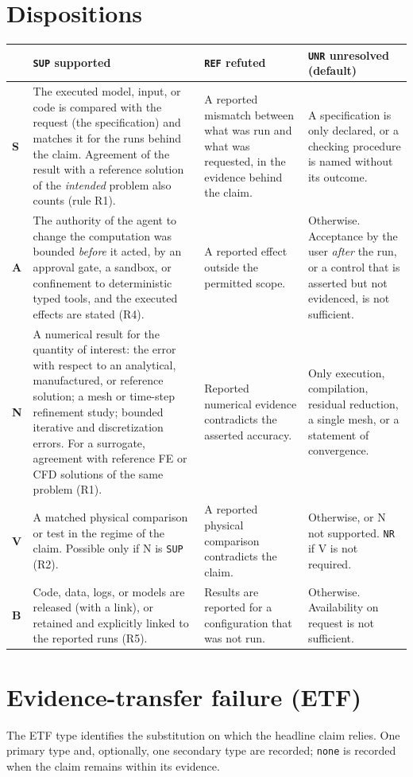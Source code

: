 \documentclass[10pt,a4paper]{article}
\begin{document}
\section{Dispositions}
\begin{tabularx}{\textwidth}{>{\bfseries}p{} L L L}
\toprule
 & \texttt{SUP} supported & \texttt{REF} refuted & \texttt{UNR} unresolved (default) \\
\midrule
S & The executed model, input, or code is compared with the request (the specification) and matches it for the runs behind the claim. Agreement of the result with a reference solution of the \emph{intended} problem also counts (rule R1). & A reported mismatch between what was run and what was requested, in the evidence behind the claim. & A specification is only declared, or a checking procedure is named without its outcome. \\
\addlinespace
A & The authority of the agent to change the computation was bounded \emph{before} it acted, by an approval gate, a sandbox, or confinement to deterministic typed tools, and the executed effects are stated (R4). & A reported effect outside the permitted scope. & Otherwise. Acceptance by the user \emph{after} the run, or a control that is asserted but not evidenced, is not sufficient. \\
\addlinespace
N & A numerical result for the quantity of interest: the error with respect to an analytical, manufactured, or reference solution; a mesh or time-step refinement study; bounded iterative and discretization errors. For a surrogate, agreement with reference FE or CFD solutions of the same problem (R1). & Reported numerical evidence contradicts the asserted accuracy. & Only execution, compilation, residual reduction, a single mesh, or a statement of convergence. \\
\addlinespace
V & A matched physical comparison or test in the regime of the claim. Possible only if N is \texttt{SUP} (R2). & A reported physical comparison contradicts the claim. & Otherwise, or N not supported. \texttt{NR} if V is not required. \\
\addlinespace
B & Code, data, logs, or models are released (with a link), or retained and explicitly linked to the reported runs (R5). & Results are reported for a configuration that was not run. & Otherwise. Availability on request is not sufficient. \\
\bottomrule
\end{tabularx}

\section{Evidence-transfer failure (ETF)}
The ETF type identifies the substitution on which the headline claim relies. One primary type and, optionally, one secondary type are recorded; \texttt{none} is recorded when the claim remains within its evidence.
\end{document}
